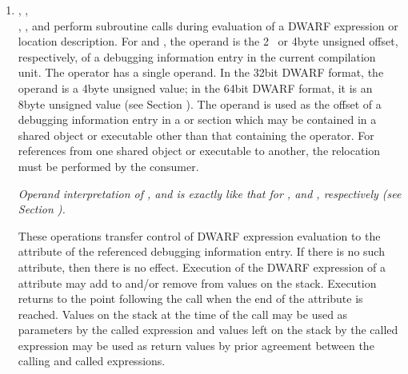 \begin{enumerate}[1]
\item {}, ,  \\
, , and  perform
subroutine calls during evaluation of a DWARF expression or
location description. 
For  and 
, 
the
operand is the 2\dash~ or 4\dash byte 
unsigned offset, respectively,
of a debugging information entry in the current compilation
unit. The  operator has a single operand. In the
32\dash bit DWARF format, the operand is a 4\dash byte unsigned value;
in the 64\dash bit DWARF format, it is an 8\dash byte unsigned value
(see Section ). 
The operand is used as the offset of a
debugging information entry in a 
or
section which may be contained in a shared object or executable
other than that containing the operator. For references from
one shared object or executable to another, the relocation
must be performed by the consumer.  

\textit{Operand interpretation of
,  and  is exactly like
that for ,  and ,
respectively  
(see Section  ).  
}

These operations transfer
control of DWARF expression evaluation to 
the 
attribute of the referenced debugging information entry. If
there is no such attribute, then there is no effect. Execution
of the DWARF expression of 
a 
 attribute may add
to and/or remove from values on the stack. Execution returns
to the point following the call when the end of the attribute
is reached. Values on the stack at the time of the call may be
used as parameters by the called expression and values left on
the stack by the called expression may be used as return values
by prior agreement between the calling and called expressions.
\end{enumerate}


